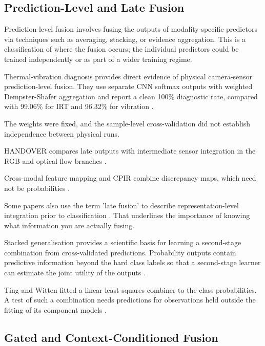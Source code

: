 \subsection{Prediction-Level and Late Fusion}

Prediction-level fusion involves fusing the outputs of modality-specific predictors via techniques
such as averaging, stacking, or evidence aggregation. This is a classification of where the fusion
occurs; the individual predictors could be trained independently or as part of a wider training
regime.

Thermal-vibration diagnosis provides direct evidence of physical camera-sensor prediction-level
fusion. They use separate CNN softmax outputs with weighted Dempster-Shafer aggregation and report a
clean 100\% diagnostic rate, compared with 99.06\% for IRT and 96.32\% for vibration \parencite[Table~VII]{Huo2022Multisensor}.

The weights were fixed, and the sample-level cross-validation did not establish independence between
physical runs.

HANDOVER compares late outputs with intermediate sensor integration in the RGB and optical flow
branches \parencite[Section~IV.A, Figure~3 and Table~III]{Thoduka2024Handover}.

Cross-modal feature mapping and CPIR combine discrepancy maps, which need not be probabilities
\parencite{Costanzino2024Multimodal,Shangguan2025CPIR}.

Some papers also use the term 'late fusion' to describe representation-level integration prior to
classification \parencite{Wang2020What}. That underlines the importance of knowing
what information you are actually fusing.

Stacked generalisation provides a scientific basis for learning a second-stage combination from
cross-validated predictions. Probability outputs contain predictive information beyond the hard
class labels so that a second-stage learner can estimate the joint utility of the outputs
\parencite[Sections~2--3]{Ting1999Issues}.

Ting and Witten fitted a linear least-squares combiner to the class probabilities. A test of such a combination needs predictions for observations held outside the fitting of its component models \parencite[Sections~2--3]{Ting1999Issues}.

\subsection{Gated and Context-Conditioned Fusion}

